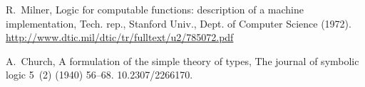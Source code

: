 \documentclass[GCNS]{yincog}
\theoremstyle{remark}
\theoremstyle{theorem}
\theoremstyle{remark}
\begin{document}
\begin{backmatter}
\begin{thebibliography}{}
\begin{bsubitem}
\begin{bcontribution}%
\end{bcontribution}
\prnsep{,\ }
\begin{bhost}
\begin{bbook}[class=report]
\end{bbook}
\end{bhost}
\begin{bhost}
\begin{behost}
\end{behost}
\end{bhost}
\end{bsubitem}
%
\OrigBibText
R.~Milner,
{Logic for
computable functions: description of a machine implementation}, Tech. rep.,
Stanford Univ., Dept. of Computer Science (1972).
 \url{http://www.dtic.mil/dtic/tr/fulltext/u2/785072.pdf}
\endOrigBibText
{}%
\endbibitem

\begin{bsubitem}
\begin{bcontribution}%
\end{bcontribution}
\begin{bhost}
\begin{bissue}
\end{bissue}
\end{bhost}
\end{bsubitem}
%
\OrigBibText
A.~Church, A formulation of the simple theory of types, The journal of
symbolic logic 5~(2) (1940) 56--68. 10.2307/2266170.
\endOrigBibText
{}%
\endbibitem


\end{thebibliography}
\end{backmatter}
\end{document}
